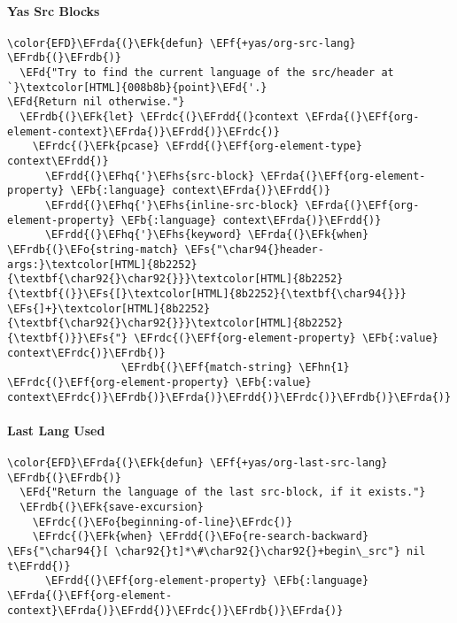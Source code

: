 \documentclass{article}
\newcommand{\EFs}[1]{\textcolor{EFs}{#1}} %
\newcommand{\EFd}[1]{\textcolor{EFd}{#1}} %
\newcommand{\EFk}[1]{\textcolor{EFk}{#1}} %
\newcommand{\EFb}[1]{\textcolor{EFb}{#1}} %
\newcommand{\EFf}[1]{\textcolor{EFf}{#1}} %
\newcommand{\EFo}[1]{\textcolor{EFo}{#1}} %
\newcommand{\EFhn}[1]{\textcolor{EFhn}{\textbf{#1}}} %
\newcommand{\EFhq}[1]{#1} %
\newcommand{\EFhs}[1]{\textcolor{EFhs}{#1}} %
\newcommand{\EFrda}[1]{\textcolor{EFrda}{#1}} %
\newcommand{\EFrdb}[1]{\textcolor{EFrdb}{#1}} %
\newcommand{\EFrdc}[1]{\textcolor{EFrdc}{#1}} %
\newcommand{\EFrdd}[1]{\textcolor{EFrdd}{#1}} %
\begin{document}
\paragraph{Yas Src Blocks}
\label{sec:org942f3ba}
\begin{Code}
\begin{Verbatim}
\color{EFD}\EFrda{(}\EFk{defun} \EFf{+yas/org-src-lang} \EFrdb{(}\EFrdb{)}
  \EFd{"Try to find the current language of the src/header at `}\textcolor[HTML]{008b8b}{point}\EFd{'.}
\EFd{Return nil otherwise."}
  \EFrdb{(}\EFk{let} \EFrdc{(}\EFrdd{(}context \EFrda{(}\EFf{org-element-context}\EFrda{)}\EFrdd{)}\EFrdc{)}
    \EFrdc{(}\EFk{pcase} \EFrdd{(}\EFf{org-element-type} context\EFrdd{)}
      \EFrdd{(}\EFhq{'}\EFhs{src-block} \EFrda{(}\EFf{org-element-property} \EFb{:language} context\EFrda{)}\EFrdd{)}
      \EFrdd{(}\EFhq{'}\EFhs{inline-src-block} \EFrda{(}\EFf{org-element-property} \EFb{:language} context\EFrda{)}\EFrdd{)}
      \EFrdd{(}\EFhq{'}\EFhs{keyword} \EFrda{(}\EFk{when} \EFrdb{(}\EFo{string-match} \EFs{"\char94{}header-args:}\textcolor[HTML]{8b2252}{\textbf{\char92{}\char92{}}}\textcolor[HTML]{8b2252}{\textbf{(}}\EFs{[}\textcolor[HTML]{8b2252}{\textbf{\char94{}}} \EFs{]+}\textcolor[HTML]{8b2252}{\textbf{\char92{}\char92{}}}\textcolor[HTML]{8b2252}{\textbf{)}}\EFs{"} \EFrdc{(}\EFf{org-element-property} \EFb{:value} context\EFrdc{)}\EFrdb{)}
                  \EFrdb{(}\EFf{match-string} \EFhn{1} \EFrdc{(}\EFf{org-element-property} \EFb{:value} context\EFrdc{)}\EFrdb{)}\EFrda{)}\EFrdd{)}\EFrdc{)}\EFrdb{)}\EFrda{)}
\end{Verbatim}
\end{Code}

\paragraph{Last Lang Used}
\label{sec:orgdbec4e6}
\begin{Code}
\begin{Verbatim}
\color{EFD}\EFrda{(}\EFk{defun} \EFf{+yas/org-last-src-lang} \EFrdb{(}\EFrdb{)}
  \EFd{"Return the language of the last src-block, if it exists."}
  \EFrdb{(}\EFk{save-excursion}
    \EFrdc{(}\EFo{beginning-of-line}\EFrdc{)}
    \EFrdc{(}\EFk{when} \EFrdd{(}\EFo{re-search-backward} \EFs{"\char94{}[ \char92{}t]*\#\char92{}\char92{}+begin\_src"} nil t\EFrdd{)}
      \EFrdd{(}\EFf{org-element-property} \EFb{:language} \EFrda{(}\EFf{org-element-context}\EFrda{)}\EFrdd{)}\EFrdc{)}\EFrdb{)}\EFrda{)}
\end{Verbatim}
\end{Code}
\end{document}
